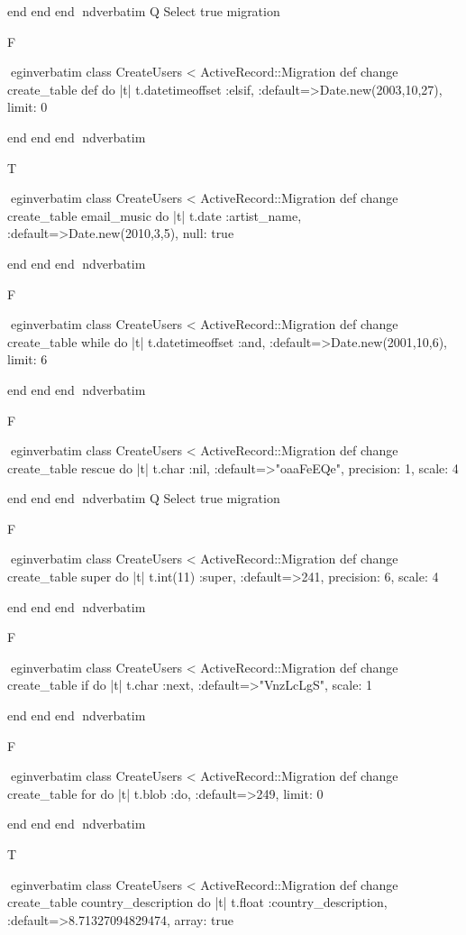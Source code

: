     end 
  end 
end
nd{verbatim}
Q
 Select true migration

F

egin{verbatim}
 class CreateUsers < ActiveRecord::Migration 
  def change 
    create_table def do |t| 
      t.datetimeoffset :elsif, :default=>Date.new(2003,10,27), limit: 0
    
    end 
  end 
end
nd{verbatim}

T

egin{verbatim}
 class CreateUsers < ActiveRecord::Migration 
  def change 
    create_table email_music do |t| 
      t.date :artist_name, :default=>Date.new(2010,3,5), null: true
    
    end 
  end 
end
nd{verbatim}

F

egin{verbatim}
 class CreateUsers < ActiveRecord::Migration 
  def change 
    create_table while do |t| 
      t.datetimeoffset :and, :default=>Date.new(2001,10,6), limit: 6
    
    end 
  end 
end
nd{verbatim}

F

egin{verbatim}
 class CreateUsers < ActiveRecord::Migration 
  def change 
    create_table rescue do |t| 
      t.char :nil, :default=>"oaaFeEQe", precision: 1, scale: 4
    
    end 
  end 
end
nd{verbatim}
Q
 Select true migration

F

egin{verbatim}
 class CreateUsers < ActiveRecord::Migration 
  def change 
    create_table super do |t| 
      t.int(11) :super, :default=>241, precision: 6, scale: 4
    
    end 
  end 
end
nd{verbatim}

F

egin{verbatim}
 class CreateUsers < ActiveRecord::Migration 
  def change 
    create_table if do |t| 
      t.char :next, :default=>"VnzLcLgS", scale: 1
    
    end 
  end 
end
nd{verbatim}

F

egin{verbatim}
 class CreateUsers < ActiveRecord::Migration 
  def change 
    create_table for do |t| 
      t.blob :do, :default=>249, limit: 0
    
    end 
  end 
end
nd{verbatim}

T

egin{verbatim}
 class CreateUsers < ActiveRecord::Migration 
  def change 
    create_table country_description do |t| 
      t.float :country_description, :default=>8.71327094829474, array: true
    
